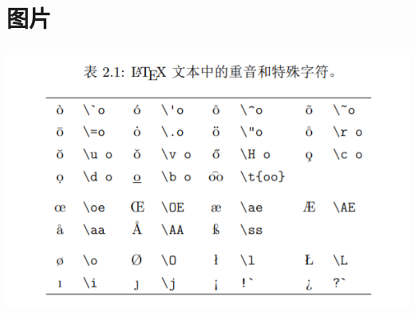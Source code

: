 \documentclass{ctexart}
\begin{document}
\section*{图片}

\includegraphics[scale=1.2]{LaTeX文本中的重音和特殊字符.png}
\end{document}
